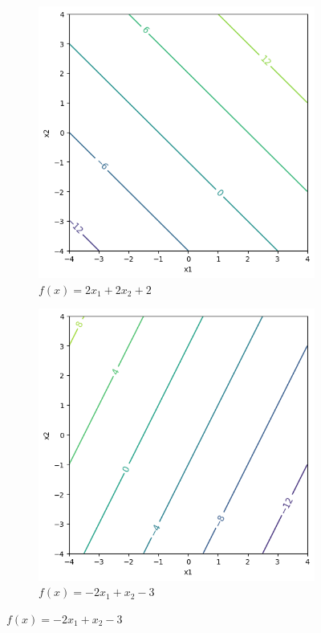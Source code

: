 \documentclass{article}
\theoremstyle{definition}
\begin{document}
\begin{figure}[hbt!]
\begin{subfigure}[b]{0.32\textwidth}
          \includegraphics[width=\textwidth]{scaling2.png} 
          \caption{$f(x) = 2 x_1 + 2 x_2 + 2$} 
          \label{fig:two_times_scaled}
      \end{subfigure} 
      \hfill
      \begin{subfigure}[b]{0.32\textwidth} 
          \centering 
          \includegraphics[width=\textwidth]{scaling3.png} 
          \caption{$f(x) = -2x_1 + x_2 - 3$} 
          \label{fig:something_else}
      \end{subfigure} 


\end{figure}
\end{document}
